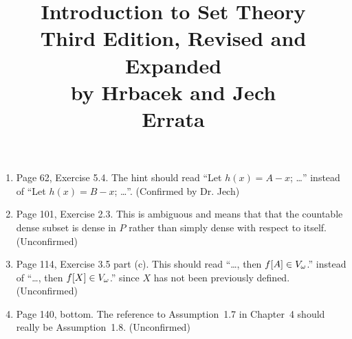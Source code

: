\documentclass{report}
\title{
  Introduction to Set Theory \\
  Third Edition, Revised and Expanded \\
  by Hrbacek and Jech \\
  Errata
}
\begin{document}


\maketitle

\begin{enumerate}

\item Page 62, Exercise 5.4. The hint should read ``Let $h(x) = A - x$; \ldots'' instead of ``Let $h(x) = B - x$; \ldots''.
  (Confirmed by Dr. Jech)

\item Page 101, Exercise 2.3. This is ambiguous and means that that the countable dense subset is dense in $P$ rather than simply dense with respect to itself. (Unconfirmed)

\item Page 114, Exercise 3.5 part (c). This should read ``\ldots, then $f[A] \in V_\omega$.'' instead of ``\ldots, then $f[X] \in V_\omega$.'' since $X$ has not been previously defined. (Unconfirmed)

\item Page 140, bottom. The reference to Assumption~1.7 in Chapter~4 should really be Assumption~1.8. (Unconfirmed)

\end{enumerate}
\end{document}

